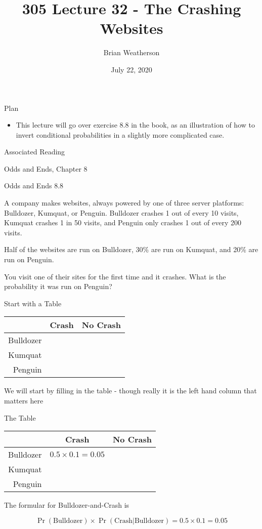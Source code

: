 \documentclass[
  ignorenonframetext,
]{beamer}
\title{305 Lecture 32 - The Crashing Websites}
\author{Brian Weatherson}
\date{July 22, 2020}
\providecommand{\tightlist}{%
  \setlength{\itemsep}{0pt}\setlength{\parskip}{0pt}}
\renewcommand{\,}{\text{, }}
\begin{document}
\frame{\titlepage}

\begin{frame}{Plan}
\protect\hypertarget{plan}{}

\begin{itemize}
\tightlist
\item
  This lecture will go over exercise 8.8 in the book, as an illustration
  of how to invert conditional probabilities in a slightly more
  complicated case.
\end{itemize}

\end{frame}

\begin{frame}{Associated Reading}
\protect\hypertarget{associated-reading}{}

Odds and Ends, Chapter 8

\end{frame}

\begin{frame}{Odds and Ends 8.8}
\protect\hypertarget{odds-and-ends-8.8}{}

A company makes websites, always powered by one of three server
platforms: Bulldozer, Kumquat, or Penguin. Bulldozer crashes 1 out of
every 10 visits, Kumquat crashes 1 in 50 visits, and Penguin only
crashes 1 out of every 200 visits.

Half of the websites are run on Bulldozer, 30\% are run on Kumquat, and
20\% are run on Penguin.

You visit one of their sites for the first time and it crashes. What is
the probability it was run on Penguin?

\end{frame}

\begin{frame}{Start with a Table}
\protect\hypertarget{start-with-a-table}{}

\begin{longtable}[]{@{}rcc@{}}
\toprule
& Crash & No Crash\tabularnewline
\midrule
\endhead
Bulldozer & &\tabularnewline
Kumquat & &\tabularnewline
Penguin & &\tabularnewline
\bottomrule
\end{longtable}

We will start by filling in the table - though really it is the left
hand column that matters here

\end{frame}

\begin{frame}{The Table}
\protect\hypertarget{the-table}{}

\begin{longtable}[]{@{}rcc@{}}
\toprule
& Crash & No Crash\tabularnewline
\midrule
\endhead
Bulldozer & \(0.5 \times 0.1 = 0.05\) &\tabularnewline
Kumquat & &\tabularnewline
Penguin & &\tabularnewline
\bottomrule
\end{longtable}

The formular for Bulldozer-and-Crash is

\[
\Pr(\text{Bulldozer}) \times \Pr(\text{Crash}|\text{Bulldozer}) = 0.5 \times 0.1 = 0.05
\]

\end{frame}
\end{document}
